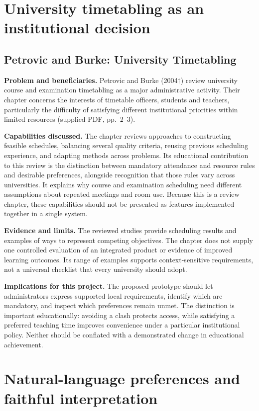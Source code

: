 \documentclass[
  11pt,a4paper,oneside]{report}
\begin{document}
\section{University timetabling as an institutional decision}
\subsection{Petrovic and Burke: University Timetabling}
\textbf{Problem and beneficiaries.} Petrovic and Burke (2004$\dagger$) review university course and examination timetabling as a major administrative activity. Their chapter concerns the interests of timetable officers, students and teachers, particularly the difficulty of satisfying different institutional priorities within limited resources (supplied PDF, pp.~2--3).

\textbf{Capabilities discussed.} The chapter reviews approaches to constructing feasible schedules, balancing several quality criteria, reusing previous scheduling experience, and adapting methods across problems. Its educational contribution to this review is the distinction between mandatory attendance and resource rules and desirable preferences, alongside recognition that those rules vary across universities. It explains why course and examination scheduling need different assumptions about repeated meetings and room use. Because this is a review chapter, these capabilities should not be presented as features implemented together in a single system.

\textbf{Evidence and limits.} The reviewed studies provide scheduling results and examples of ways to represent competing objectives. The chapter does not supply one controlled evaluation of an integrated product or evidence of improved learning outcomes. Its range of examples supports context-sensitive requirements, not a universal checklist that every university should adopt.

\textbf{Implications for this project.} The proposed prototype should let administrators express supported local requirements, identify which are mandatory, and inspect which preferences remain unmet. The distinction is important educationally: avoiding a clash protects access, while satisfying a preferred teaching time improves convenience under a particular institutional policy. Neither should be conflated with a demonstrated change in educational achievement.

\section{Natural-language preferences and faithful interpretation}
\end{document}
